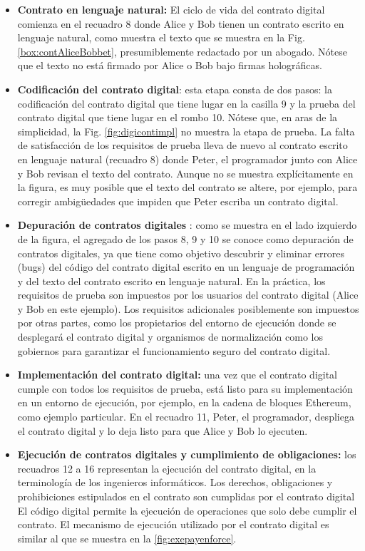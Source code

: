 \documentclass[12pt]{report} %
\begin{document}
\begin{itemize}
    \item \textbf{Contrato en lenguaje natural:} El ciclo de vida del contrato digital comienza en el recuadro 8 donde Alice y Bob tienen un contrato escrito en lenguaje natural, como muestra el texto que se muestra en la Fig. \ref{box:contAliceBobbet}, presumiblemente redactado por un abogado. Nótese que el texto no está firmado por Alice o Bob bajo firmas holográficas.
    \item \textbf{Codificación del contrato digital}: esta etapa consta de dos pasos: la codificación del contrato digital que tiene lugar en la casilla 9 y la prueba del contrato digital que tiene lugar en el rombo 10. Nótese que, en aras de la simplicidad, la Fig. \ref{fig:digicontimpl} no muestra la etapa de prueba. La falta de satisfacción de los requisitos de prueba lleva de nuevo al contrato escrito en lenguaje natural (recuadro 8) donde Peter, el programador junto con Alice y Bob revisan el texto del contrato. Aunque no se muestra explícitamente en la figura, es muy posible que el texto del contrato se altere, por ejemplo, para corregir ambigüedades que impiden que Peter escriba un contrato digital.

     \item \textbf{Depuración de contratos digitales} : como se muestra en el lado izquierdo de la figura, el agregado de los pasos 8, 9 y 10 se conoce como depuración de contratos digitales, ya que tiene como objetivo descubrir y eliminar errores (bugs) del código del contrato digital escrito en un lenguaje de programación y del texto del contrato escrito en lenguaje natural. En la práctica, los requisitos de prueba son impuestos por los usuarios del contrato digital (Alice y Bob en este ejemplo). Los requisitos adicionales posiblemente son impuestos por otras partes, como los propietarios del entorno de ejecución donde se desplegará el contrato digital y organismos de normalización como los gobiernos para garantizar el funcionamiento seguro del contrato digital.
     \item \textbf{Implementación del contrato digital: }una vez que el contrato digital cumple con todos los requisitos de prueba, está listo para su implementación en un entorno de ejecución, por ejemplo, en la cadena de bloques Ethereum, como ejemplo particular. En el recuadro 11, Peter, el programador, despliega el contrato digital y lo deja listo para que Alice y Bob lo ejecuten.
     \item\textbf{Ejecución de contratos digitales y cumplimiento de obligaciones:} los
     recuadros 12 a 16 representan la ejecución del contrato digital, en la terminología de los ingenieros informáticos. Los derechos, obligaciones y prohibiciones estipulados en el contrato son cumplidas por el contrato digital El código digital permite la ejecución de operaciones que solo debe cumplir el contrato. El mecanismo de ejecución utilizado por el contrato digital es similar al que se muestra en la \ref{fig:exepayenforce}.



\end{itemize}
\end{document}
